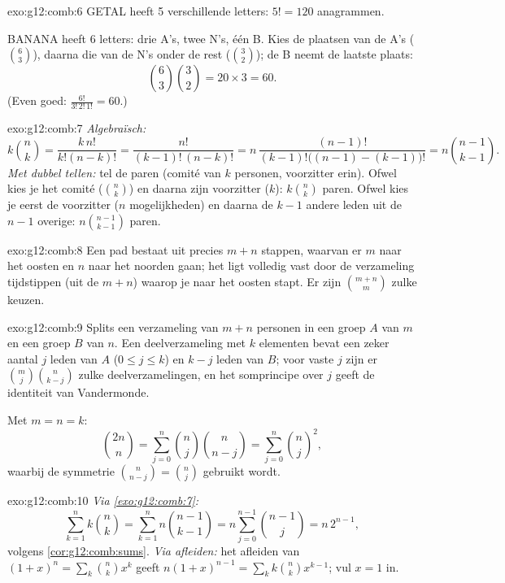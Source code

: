 \begin{solution}{exo:g12:comb:6}
GETAL heeft 5 verschillende letters: $5! = 120$ anagrammen.

BANANA heeft 6 letters: drie A's, twee N's, één B. Kies de plaatsen van de
A's ($\binom63$), daarna die van de N's onder de rest ($\binom32$); de B
neemt de laatste plaats:
\[
\binom{6}{3}\binom{3}{2} = 20 \times 3 = 60 .
\]
(Even goed: $\frac{6!}{3!\,2!\,1!} = 60$.)
\end{solution}

\begin{solution}{exo:g12:comb:7}
\emph{Algebraïsch:}
\[
k\binom nk = \frac{k\,n!}{k!(n-k)!} = \frac{n!}{(k-1)!\,(n-k)!}
= n\,\frac{(n-1)!}{(k-1)!\bigl((n-1)-(k-1)\bigr)!} = n\binom{n-1}{k-1}.
\]
\emph{Met dubbel tellen:} tel de paren (comité van $k$ personen, voorzitter
erin). Ofwel kies je het comité ($\binom nk$) en daarna zijn voorzitter
($k$): $k\binom nk$ paren. Ofwel kies je eerst de voorzitter ($n$
mogelijkheden) en daarna de $k-1$ andere leden uit de $n-1$ overige:
$n\binom{n-1}{k-1}$ paren.
\end{solution}

\begin{solution}{exo:g12:comb:8}
Een pad bestaat uit precies $m + n$ stappen, waarvan er $m$ naar het oosten
en $n$ naar het noorden gaan; het ligt volledig vast door de verzameling
tijdstippen (uit de $m+n$) waarop je naar het oosten stapt. Er zijn
$\binom{m+n}{m}$ zulke keuzen.
\end{solution}

\begin{solution}{exo:g12:comb:9}
Splits een verzameling van $m + n$ personen in een groep $A$ van $m$ en een
groep $B$ van $n$. Een deelverzameling met $k$ elementen bevat een zeker
aantal $j$ leden van $A$ ($0 \leq j \leq k$) en $k - j$ leden van $B$; voor
vaste $j$ zijn er $\binom mj \binom{n}{k-j}$ zulke deelverzamelingen, en het
somprincipe over $j$ geeft de identiteit van Vandermonde.

Met $m = n = k$:
\[
\binom{2n}{n} = \sum_{j=0}^n \binom nj \binom{n}{n-j}
= \sum_{j=0}^n \binom nj^{2},
\]
waarbij de symmetrie $\binom{n}{n-j} = \binom nj$ gebruikt wordt.
\end{solution}

\begin{solution}{exo:g12:comb:10}
\emph{Via \cref{exo:g12:comb:7}:}
\[
\sum_{k=1}^n k\binom nk = \sum_{k=1}^n n\binom{n-1}{k-1}
= n\sum_{j=0}^{n-1}\binom{n-1}{j} = n\,2^{n-1},
\]
volgens \cref{cor:g12:comb:sums}. \emph{Via afleiden:} het afleiden van
$(1+x)^n = \sum_k \binom nk x^k$ geeft
$n(1+x)^{n-1} = \sum_k k \binom nk x^{k-1}$; vul $x = 1$ in.
\end{solution}

